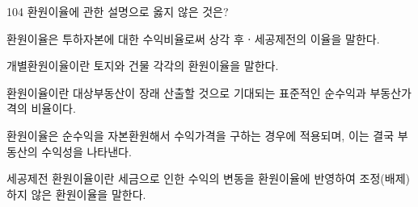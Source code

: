 \begin{question}{104}
환원이율에 관한 설명으로 옳지 않은 것은?
\begin{choices}
  \item 환원이율은 투하자본에 대한 수익비율로써 상각 후ㆍ세공제전의 이율을 말한다.
  \item 개별환원이율이란 토지와 건물 각각의 환원이율을 말한다.
  \item 환원이율이란 대상부동산이 장래 산출할 것으로 기대되는 표준적인 순수익과 부동산가격의 비율이다.
  \item 환원이율은 순수익을 자본환원해서 수익가격을 구하는 경우에 적용되며, 이는 결국 부동산의 수익성을 나타낸다.
  \item 세공제전 환원이율이란 세금으로 인한 수익의 변동을 환원이율에 반영하여 조정(배제)하지 않은 환원이율을 말한다.
\end{choices}
\end{question}

